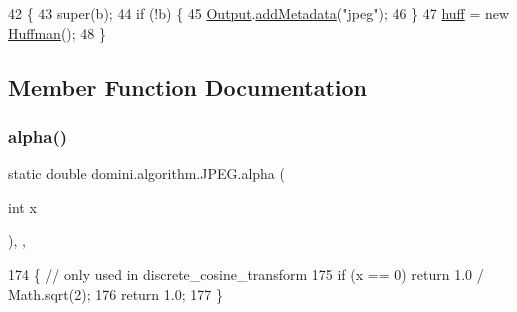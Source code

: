 \begin{DoxyCode}
42                            \{
43         super(b);
44         \textcolor{keywordflow}{if} (!b) \{
45             \hyperlink{classdomini_1_1algorithm_1_1Algorithm_a4de9955411c656325adc391ef570c082}{Output}.\hyperlink{classpersistencia_1_1output_1_1Ctrl__Output_ae6d6857910a023982900ddc857b891f0}{addMetadata}(\textcolor{stringliteral}{"jpeg"});
46         \}
47         \hyperlink{classdomini_1_1algorithm_1_1JPEG_aacc6445baa7819e3f9139ffb78e0b8f4}{huff} = \textcolor{keyword}{new} \hyperlink{classHuffman}{Huffman}();
48     \}
\end{DoxyCode}


\subsection{Member Function Documentation}
\mbox{\label{classdomini_1_1algorithm_1_1JPEG_a058b0ee7eb44bbaec4078b5fc32c5107}} 
\subsubsection{\texorpdfstring{alpha()}{alpha()}}
{\footnotesize\ttfamily static double domini.\+algorithm.\+J\+P\+E\+G.\+alpha (\begin{DoxyParamCaption}\item[{int}]{x }\end{DoxyParamCaption})\hspace{0.3cm}{\ttfamily [inline]}, {\ttfamily [static]}, {\ttfamily [private]}}


\begin{DoxyCode}
174                                        \{ \textcolor{comment}{// only used in discrete\_cosine\_transform}
175         \textcolor{keywordflow}{if} (x == 0) \textcolor{keywordflow}{return} 1.0 / Math.sqrt(2);
176         \textcolor{keywordflow}{return} 1.0;
177     \}
\end{DoxyCode}
\mbox{\label{classdomini_1_1algorithm_1_1JPEG_a753bf49f2c8bde9e54464b21a1bcb2d8}} 
